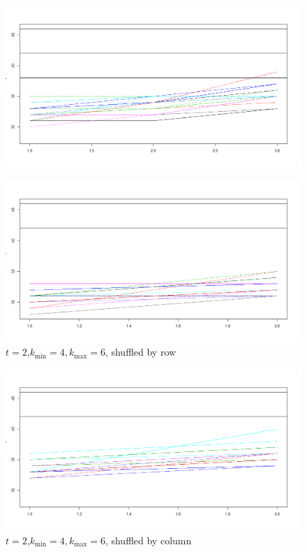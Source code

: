 \documentclass[xcolor=dvipsnames]{beamer}
\begin{document}
\begin{frame}
\begin{figure}
\centering
\includegraphics[width=0.9\linewidth]{bycolmat.png}
\end{figure}
\end{frame}
\begin{frame}
\begin{figure}
\centering
\includegraphics[width=0.9\linewidth]{twoslices.png}
\caption{$t=2$,$k_{\min}=4,k_{\max}=6$, shuffled by row}
\end{figure}
\end{frame}
\begin{frame}
\begin{figure}
\centering
\includegraphics[width=0.9\linewidth]{twoslicesbycolumn.png}
\caption{$t=2$,$k_{\min}=4,k_{\max}=6$, shuffled by column}
\end{figure}
\end{frame}
\end{document}
